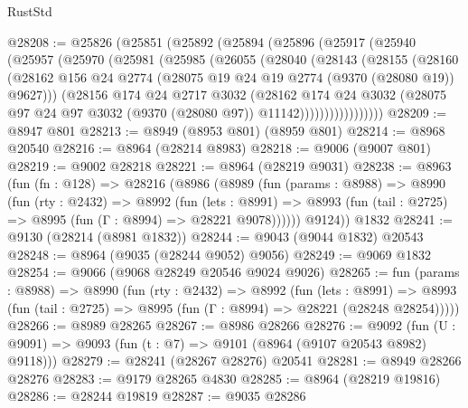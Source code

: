 \begin{lexlean}{RustStd}
\begin{coremodule}
@28208 := @25826
    (@25851
      (@25892
        (@25894
          (@25896
            (@25917
              (@25940
                (@25957
                  (@25970
                    (@25981
                      (@25985
                        (@26055
                          (@28040
                            (@28143
                              (@28155
                                (@28160
                                  (@28162
                                    @156
                                    @24
                                    @2774
                                    (@28075 @19 @24 @19 @2774 (@9370 (@28080 @19)) @9627)))
                                (@28156
                                  @174
                                  @24
                                  @2717
                                  @3032
                                  (@28162
                                    @174
                                    @24
                                    @3032
                                    (@28075
                                      @97
                                      @24
                                      @97
                                      @3032
                                      (@9370 (@28080 @97))
                                      @11142)))))))))))))))))
@28209 := @8947 @801
@28213 := @8949 (@8953 @801) (@8959 @801)
@28214 := @8968 @20540
@28216 := @8964 (@28214 @8983)
@28218 := @9006 (@9007 @801)
@28219 := @9002 @28218
@28221 := @8964 (@28219 @9031)
@28238 := @8963
    (fun (fn : @128) =>
    @28216
      (@8986
        (@8989
          (fun (params : @8988) =>
          @8990
            (fun (rty : @2432) =>
            @8992
              (fun (lets : @8991) =>
              @8993 (fun (tail : @2725) => @8995 (fun (Γ : @8994) => @28221 @9078))))))
        @9124))
    @1832
@28241 := @9130 (@28214 (@8981 @1832))
@28244 := @9043 (@9044 @1832) @20543
@28248 := @8964 (@9035 (@28244 @9052) @9056)
@28249 := @9069 @1832
@28254 := @9066 (@9068 @28249 @20546 @9024 @9026)
@28265 := fun (params : @8988) =>
  @8990
    (fun (rty : @2432) =>
    @8992
      (fun (lets : @8991) =>
      @8993 (fun (tail : @2725) => @8995 (fun (Γ : @8994) => @28221 (@28248 @28254)))))
@28266 := @8989 @28265
@28267 := @8986 @28266
@28276 := @9092
    (fun (U : @9091) => @9093 (fun (t : @7) => @9101 (@8964 (@9107 @20543 @8982) @9118)))
@28279 := @28241 (@28267 @28276) @20541
@28281 := @8949 @28266 @28276
@28283 := @9179 @28265 @4830
@28285 := @8964 (@28219 @19816)
@28286 := @28244 @19819
@28287 := @9035 @28286

\end{coremodule}
\end{lexlean}
